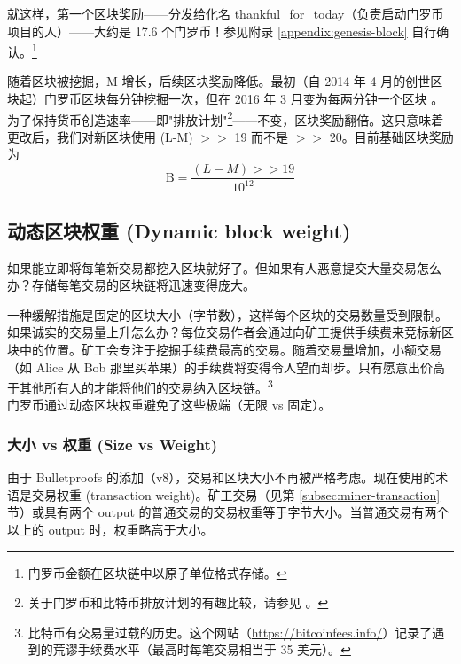 就这样，第一个区块奖励——分发给化名 thankful\_for\_today（负责启动门罗币项目的人）——大约是 17.6 个门罗币！参见附录 \ref{appendix:genesis-block} 自行确认。\footnote{门罗币金额在区块链中以原子单位格式存储。}

随着区块被挖掘，M 增长，后续区块奖励降低。最初（自 2014 年 4 月的创世区块起）门罗币区块每分钟挖掘一次，但在 2016 年 3 月变为每两分钟一个区块 \cite{monero-0.9.3}。为了保持货币创造速率——即"排放计划"\footnote{关于门罗币和比特币排放计划的有趣比较，请参见 \cite{monero-coin-emission}。}——不变，区块奖励翻倍。这只意味着更改后，我们对新区块使用 (L-M) $>>$ 19 而不是 $>>$ 20。目前基础区块奖励为\vspace{.175cm}
\[\textrm{B} = \frac{(L-M) >> 19}{10^{12}}\]


\subsection{动态区块权重 (Dynamic block weight)}
\label{subsec:dynamic-block-weight}

如果能立即将每笔新交易都挖入区块就好了。但如果有人恶意提交大量交易怎么办？存储每笔交易的区块链将迅速变得庞大。

一种缓解措施是固定的区块大小（字节数），这样每个区块的交易数量受到限制。如果诚实的交易量上升怎么办？每位交易作者会通过向矿工提供手续费来竞标新区块中的位置。矿工会专注于挖掘手续费最高的交易。随着交易量增加，小额交易（如 Alice 从 Bob 那里买苹果）的手续费将变得令人望而却步。只有愿意出价高于其他所有人的才能将他们的交易纳入区块链。\footnote{比特币有交易量过载的历史。这个网站（\url{https://bitcoinfees.info/}）记录了遇到的荒谬手续费水平（最高时每笔交易相当于 35 美元）。}\\

门罗币通过动态区块权重避免了这些极端（无限 vs 固定）。


\subsubsection*{大小 vs 权重 (Size vs Weight)}

由于 Bulletproofs 的添加（v8），交易和区块大小不再被严格考虑。现在使用的术语是{交易权重 (transaction weight)}。矿工交易（见第 \ref{subsec:miner-transaction} 节）或具有两个 output 的普通交易的交易权重等于字节大小。当普通交易有两个以上的 output 时，权重略高于大小。

